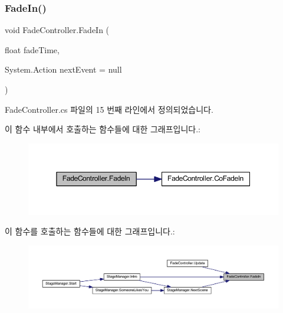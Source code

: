 \subsubsection{\texorpdfstring{FadeIn()}{FadeIn()}}
{\footnotesize\ttfamily void Fade\+Controller.\+Fade\+In (\begin{DoxyParamCaption}\item[{float}]{fade\+Time,  }\item[{System.\+Action}]{next\+Event = {\ttfamily null} }\end{DoxyParamCaption})}



Fade\+Controller.\+cs 파일의 15 번째 라인에서 정의되었습니다.


\begin{DoxyCode}{0}

\end{DoxyCode}
이 함수 내부에서 호출하는 함수들에 대한 그래프입니다.\+:\nopagebreak
\begin{figure}[H]
\begin{center}
\leavevmode
\includegraphics[width=350pt]{d3/dd7/class_fade_controller_a1548aeda608cc1dba1db3adaeff20430_cgraph}
\end{center}
\end{figure}
이 함수를 호출하는 함수들에 대한 그래프입니다.\+:\nopagebreak
\begin{figure}[H]
\begin{center}
\leavevmode
\includegraphics[width=350pt]{d3/dd7/class_fade_controller_a1548aeda608cc1dba1db3adaeff20430_icgraph}
\end{center}
\end{figure}
\mbox{\label{class_fade_controller_a0f5a8752a7f7cefa8e81b845b21b3f4a}} 
